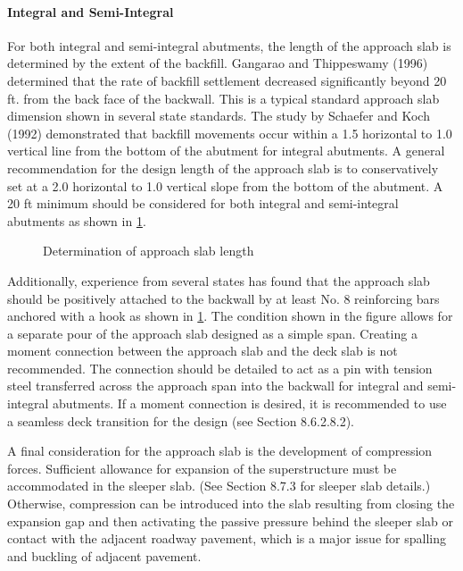 \paragraph{Integral and Semi-Integral}

For both integral and semi-integral abutments, the length of the approach slab is determined by the extent of the
backfill. Gangarao and Thippeswamy (1996) determined that the rate of backfill settlement decreased significantly
beyond 20 ft. from the back face of the backwall. This is a typical standard approach slab dimension shown in several
state standards. The study by Schaefer and Koch (1992) demonstrated that backfill movements occur within a 1.5
horizontal to 1.0 vertical line from the bottom of the abutment for integral abutments. A general recommendation for
the design length of the approach slab is to conservatively set at a 2.0 horizontal to 1.0 vertical slope from the bottom
of the abutment. A 20 ft minimum should be considered for both integral and semi-integral abutments as shown in
\cref{fig:determination-approach-slab-length}.

\begin{figure}
  \caption{Determination of approach slab length}
  \label{fig:determination-approach-slab-length}
\end{figure}

Additionally, experience from several states has found that the approach slab should be positively attached to the
backwall by at least No. 8 reinforcing bars anchored with a hook as shown in \cref{fig:determination-approach-slab-length}. The condition shown in the
figure allows for a separate pour of the approach slab designed as a simple span. Creating a moment connection
between the approach slab and the deck slab is not recommended. The connection should be detailed to act as a pin
with tension steel transferred across the approach span into the backwall for integral and semi-integral abutments. If a
moment connection is desired, it is recommended to use a seamless deck transition for the design (see Section
8.6.2.8.2).

A final consideration for the approach slab is the development of compression forces. Sufficient allowance for
expansion of the superstructure must be accommodated in the sleeper slab. (See Section 8.7.3 for sleeper slab details.)
Otherwise, compression can be introduced into the slab resulting from closing the expansion gap and then activating
the passive pressure behind the sleeper slab or contact with the adjacent roadway pavement, which is a major issue for
spalling and buckling of adjacent pavement.





